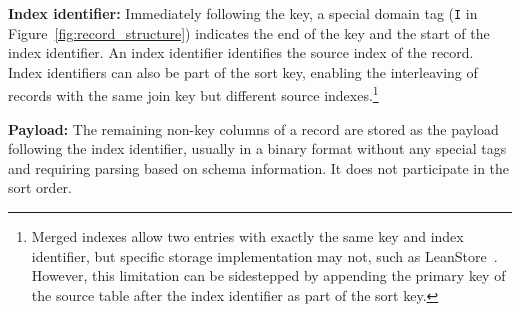\documentclass[sigconf, pdfa, nonacm]{acmart}
\begin{document}
\textbf{Index identifier:} Immediately following the key, a special domain tag (\texttt{I} in Figure~\ref{fig:record_structure}) indicates the end of the key and the start of the index identifier. An index identifier identifies the source index of the record. Index identifiers can also be part of the sort key, enabling the interleaving of records with the same join key but different source indexes.\footnote{Merged indexes allow two entries with exactly the same key and index identifier, but specific storage implementation may not, such as LeanStore~\cite{leanstore18}. However, this limitation can be sidestepped by appending the primary key of the source table after the index identifier as part of the sort key.}

\textbf{Payload:} The remaining non-key columns of a record are stored as the payload following the index identifier, usually in a binary format without any special tags and requiring parsing based on schema information. It does not participate in the sort order.
\end{document}
